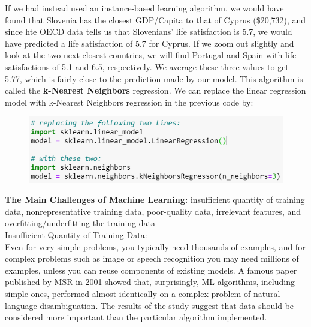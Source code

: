     \noindent If we had instead used an instance-based learning algorithm, we would have found that Slovenia
    has the closest GDP/Capita to that of Cyprus (\$20,732), and since hte OECD data tells us that
    Slovenians' life satisfaction is 5.7, we would have predicted a life satisfaction of 5.7 for Cyprus. If we
    zoom out slightly and look at the two next-closest countries, we will find Portugal and Spain with life
    satisfactions of 5.1 and 6.5, respectively. We average these three values to get 5.77, which is fairly
    close to the prediction made by our model. This algorithm is called the \textbf{k-Nearest Neighbors}
    regression. We can replace the linear regression model with k-Nearest Neighbors regression in the previous
    code by:

    \begin{figure}[hbt!]
        \centering
        \includegraphics[scale=0.8]{Resources/k_nearest_neighbors}
    \end{figure}

    \noindent \textbf{The Main Challenges of Machine Learning:} insufficient quantity of training data,
    nonrepresentative training data, poor-quality data, irrelevant features, and overfitting/underfitting the
    training data \\

    \noindent Insufficient Quantity of Training Data: \\
    Even for very simple problems, you typically need thousands of examples, and for complex problems such as
    image or speech recognition you may need millions of examples, unless you can reuse components of existing
    models. A famous paper published by MSR in 2001 showed that, surprisingly, ML algorithms, including simple
    ones, performed almost identically on a complex problem of natural language disambiguation. The results of
    the study suggest that data should be considered more important than the particular algorithm implemented. \\

